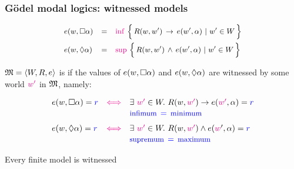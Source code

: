 \begin{frame}\frametitle{G\"odel modal logics: witnessed models}


  \begin{tcolorbox}[colframe=blue!75!black,width=30em]
  \[\small
    \begin{array}{lcl}
 e(w,\Box \alpha) &= &{\color{magenta} \inf}\ \Big\{\,R(w,w')\,\to\, e(w',\alpha)~|~w'\in W \,\Big\}
 \\[2ex]
  e(w,\lozenge \alpha) &= &{\color{magenta} \sup}\ \Big\{\,R(w,w')\,\land\, e(w',\alpha)~|~w'\in W  \,\Big\}
    \end{array}
 \]
\end{tcolorbox}
  


\medskip
 

$\mathfrak{M}=\langle W,R,e \rangle$ is   if the values of $e(w,\Box\alpha)$ and $e(w,\lozenge\alpha)$
are witnessed by some world ${\color{magenta} w'}$ in $\mathfrak{M}$, namely:


\medskip
\begin{tcolorbox}[colframe=blue!75!black,width=30em]
  \[
  \begin{array}{lcl}
 e(w,\Box \a)=\tb{r}  &\tm\IFF& \exists\ \tm{w'}\in W.\ R(w,\tm{w'}) \to  e(\tm{w'},\a) = \tb{r}
\\[.3ex]
        &&\tb{\text{\small infimum}  \,=\,  \text{\small minimum} }
  \\[1.5ex]
 e(w,\Diam \a)=\tb{r}  &\tm\IFF& \exists\ \tm{w'}\in W.\ R(w,\tm{w'}) \land  e(\tm{w}',\a) = \tb{r}
\\[.3ex]
                 &&
\tb{\text{\small supremum}  \,=\,  \text{\small maximum} }
 \end{array}
\]
\end{tcolorbox}

\medskip
 Every finite model is witnessed




  \VFILL
  
\end{frame}





